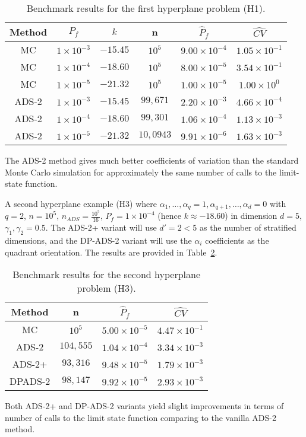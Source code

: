 \begin{table}
    \centering
    \begin{tabular}{cccccc}
        \hline
        Method & $P_f$ & $k$ & n & $\hat P_f$ & $\hat {CV}$ \\
        \hline
        MC & $1 \times 10^{-3}$ & $-15.45$ & $10^5$ & $9.00 \times 10^{-4}$ & $1.05 \times 10^{-1}$ \\
        MC & $1 \times 10^{-4}$ & $-18.60$ & $10^5$ & $8.00 \times 10^{-5}$ & $3.54 \times 10^{-1}$\\
        MC & $1 \times 10^{-5}$ & $-21.32$ & $10^5$ & $1.00 \times 10^{-5}$ & $1.00 \times 10^{0}$\\
        ADS-2 & $1 \times 10^{-3}$ & $-15.45$ & $99,671$ & $2.20 \times 10^{-3}$ & $4.66 \times 10^{-4}$\\
        ADS-2 & $1 \times 10^{-4}$ & $-18.60$ & $99,301$ & $1.06 \times 10^{-4}$ & $1.13 \times 10^{-3}$\\
        ADS-2 & $1 \times 10^{-5}$ & $-21.32$ & $10,0943$ & $9.91 \times 10^{-6}$ & $1.63 \times 10^{-3}$\\
        \hline
    \end{tabular}
    \label{tab:H1}
    \caption{Benchmark results for the first hyperplane problem (H1).}
\end{table}

The ADS-2 method gives much better coefficients of variation than the standard Monte Carlo simulation for approximately the same number of calls to the limit-state function.\par

A second hyperplane example (H3) where $\alpha_1, \dots, \alpha_q = 1, \alpha_{q+1}, \dots, \alpha_{d} = 0$ with $q = 2$, $n = 10^5$, $n_{ADS} = \frac{10^5}{16}$, $P_f = 1 \times 10^{-4}$ (hence $k \approx -18.60$) in dimension $d=5$, $\gamma_1,\gamma_2=0.5$. The ADS-2+ variant will use $d' = 2 < 5$ as the number of stratified dimensions, and the DP-ADS-2 variant will use the $\alpha_i$ coefficients as the quadrant orientation. The results are provided in Table~\ref{tab:H3}.\par

\begin{table}
    \centering
    \begin{tabular}{cccc}
        \hline
        Method & n & $\hat P_f$ & $\hat {CV}$ \\
        \hline
        MC & $10^5$ & $5.00 \times 10^{-5}$ & $4.47 \times 10^{-1}$ \\
        ADS-2 & $104,555$ & $1.04 \times 10^{-4}$ & $3.34 \times 10^{-3}$ \\
        ADS-2+ & $93,316$ & $9.48 \times 10^{-5}$ & $1.79 \times 10^{-3}$ \\
        DPADS-2 & $98,147$ & $9.92 \times 10^{-5}$ & $2.93 \times 10^{-3}$ \\
        \hline
    \end{tabular}
    \caption{Benchmark results for the second hyperplane problem (H3).}
    \label{tab:H3}
\end{table}

Both ADS-2+ and DP-ADS-2 variants yield slight improvements in terms of number of calls to the limit state function comparing to the vanilla ADS-2 method.\par
